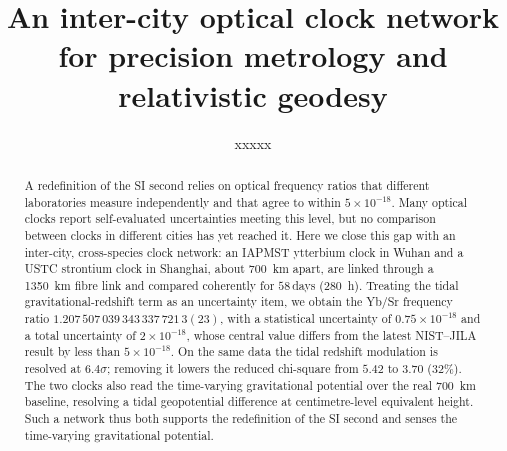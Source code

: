 \documentclass[11pt,a4paper]{article}
\title{An inter-city optical clock network for precision metrology
and relativistic geodesy}
\author{%
  xxxxx%
}
\date{}
\begin{document}
\maketitle

\begin{abstract}
\sloppy
A redefinition of the SI second relies on optical frequency ratios that
different laboratories measure independently and that agree to within
$5\times10^{-18}$. Many optical clocks report self-evaluated uncertainties
meeting this level, but no comparison between clocks in different cities
has yet reached it. Here we close this gap with an inter-city,
cross-species clock network: an IAPMST ytterbium clock in Wuhan and a USTC
strontium clock in Shanghai, about \qty{700}{km} apart, are linked through a
\qty{1350}{km} fibre link and compared coherently for $58$\,days
(\qty{280}{h}). Treating the tidal gravitational-redshift term as an
uncertainty item, we obtain the Yb/Sr frequency ratio
$1.207\,507\,039\,343\,337\,721\,3(23)$, with a statistical uncertainty of
$0.75\times10^{-18}$ and a total uncertainty of $2\times10^{-18}$, whose
central value differs from the latest NIST--JILA result by less than
$5\times10^{-18}$. On the same data the tidal redshift modulation is
resolved at $6.4\sigma$; removing it lowers the reduced chi-square from
$5.42$ to $3.70$ ($32\%$). The two clocks also read the time-varying
gravitational potential over the real \qty{700}{km} baseline, resolving a
tidal geopotential difference at centimetre-level equivalent height. Such a network thus both supports the redefinition
of the SI second and senses the time-varying gravitational potential.
\end{abstract}
\end{document}

